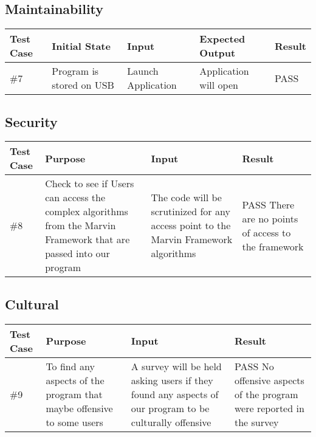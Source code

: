 \documentclass[12pt, titlepage]{article}
\begin{document}
\subsection{Maintainability}
\begin{table}[!hb]
\scriptsize
\begin{tabu} to 1.1\textwidth { | X[.3] | X[.7] | X[.7] | X[.7] | X[.3] |}
\hline
	      		Test Case & Initial State & Input & Expected Output & Result \\
\hline
\#7
& Program is stored on USB
& Launch Application
& Application will open
& PASS\\
\hline
	\end{tabu}
	\end{table}

\subsection{Security}
\begin{table}[!hb]
\scriptsize
\begin{tabu} to 1.1\textwidth { | X[.3] | X[.7] | X[.7] | X[.7] |}
\hline
	      		Test Case & Purpose & Input & Result \\
\hline
\#8
& Check to see if Users can access the complex algorithms from the Marvin Framework that are passed into our program
& The code will be scrutinized for any access point to the Marvin Framework algorithms
& PASS There are no points of access to the framework\\
\hline
	\end{tabu}
	\end{table}

\subsection{Cultural}
\begin{table}[h]
\scriptsize
\begin{tabu} to 1.1\textwidth { | X[.3] | X[.7] | X[.7] | X[.7] |}
\hline
	      		Test Case & Purpose & Input & Result \\
\hline
\#9
& To find any aspects of the program that maybe offensive to some users
& A survey will be held asking users if they found any aspects of our program to be culturally offensive
& PASS No offensive aspects of the program were reported in the survey\\
\hline
	\end{tabu}
	\end{table}
\end{document}
